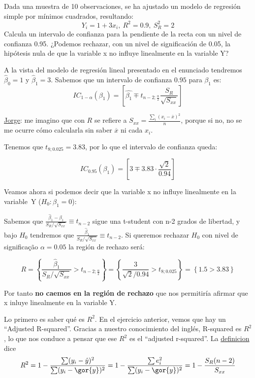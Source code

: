 \begin{problem}[2]
Dada una muestra de 10 observaciones, se ha ajustado un modelo de regresión simple por mínimos cuadrados, resultando:
  \[Y_i =1+3x_i,\ R^2 =0.9,\ S_R^2 =2\]
Calcula un intervalo de confianza para la pendiente de la recta con un nivel de confianza 0.95. ¿Podemos rechazar, con un nivel de significación de 0.05, la hipótesis nula de que la variable x no influye linealmente en la variable Y?

\solution 
{}

A la vista del modelo de regresión lineal presentado en el enunciado tendremos $\hat{β}_0=1$ y $\hat{β}_1=3$. Sabemos que un intervalo de confianza $0.95$ para $β_1$ es:
\[IC_{1-α}(β_1) = \left[ \hat{β_1} \mp t_{n-2;\frac{α}{2}} \frac{S_R}{\sqrt{S_{xx}}} \right]\]

{\color{gray} \underline{Jorge}: me imagino que con $R$ se refiere a $S_{xx} = \frac{\sum_i (x_i - \overline{x})^2}{n}$, porque si no, no se me ocurre cómo calcularla sin saber $\overline{x}$ ni cada $x_i$}.

Tenemos que $t_{8;0.025} = 3.83$, por lo que el intervalo de confianza queda:

\[IC_{0.95}(β_1) = \left[ 3 \mp 3.83 · \frac{\sqrt{2}}{0.94} \right]\]

Veamos ahora si podemos decir que la variable x no influye linealmente en la variable~Y ($H_0: β_1=0$):

Sabemos que $\frac{\hat{β}_1 - β_1}{S_R / \sqrt{S_{xx}}} \equiv t_{n-2}$ sigue una t-student con n-2 grados de libertad, y bajo $H_0$ tendremos que $\frac{\hat{β}_1 }{S_R / \sqrt{S_{xx}}} \equiv t_{n-2}$. Si queremos rechazar $H_0$ con nivel de significação $α=0.05$ la región de rechazo será:

\[R = \left\{ \frac{\hat{β}_1 }{S_R / \sqrt{S_{xx}}} > t_{n-2;\frac{α}{2}} \right\} = \left\{ \frac{3}{\sqrt{2} / 0.94} > t_{8;0.025} \right\} = \left\{ 1.5 > 3.83 \right\}\]

Por tanto \textbf{no caemos en la región de rechazo} que nos permitiría afirmar que x inluye linealmente en la variable Y.


Lo primero es saber qué es $R^2$. En el ejercicio anterior, vemos que hay un ``Adjusted R-squared''. Gracias a nuestro conocimiento del inglés, R-squared es $R^2$, lo que nos conduce a pensar que ese $R^2$ es el ``adjusted r-squared''. La \href{https://en.wikipedia.org/wiki/Coefficient_of_determination}{definicion}  dice 
\[
R^2 = 1 - \frac{\sum (y_i-\hat{y})^2}{\sum (y_i-\gor{y})^2} = 1-\frac{\sum e_i^2}{\sum (y_i-\gor{y})^2} = 1 - \frac{S_R(n-2)}{S_{xx}}
\]


\end{problem}
